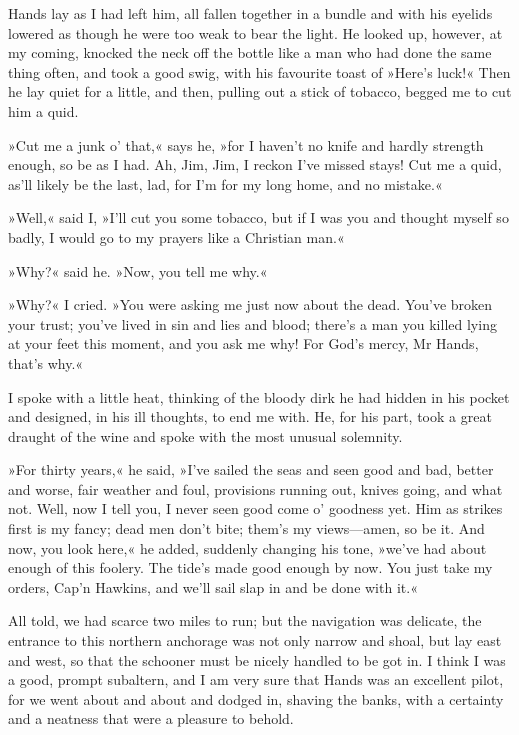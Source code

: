Hands lay as I had left him, all fallen together in a bundle and with his eyelids lowered as though he were too weak to bear the light. He looked up, however, at my coming, knocked the neck off the bottle like a man who had done the same thing often, and took a good swig, with his favourite toast of »Here's luck!« Then he lay quiet for a little, and then, pulling out a stick of tobacco, begged me to cut him a quid.

»Cut me a junk o' that,« says he, »for I haven't no knife and hardly strength enough, so be as I had. Ah, Jim, Jim, I reckon I've missed stays! Cut me a quid, as'll likely be the last, lad, for I'm for my long home, and no mistake.«

»Well,« said I, »I'll cut you some tobacco, but if I was you and thought myself so badly, I would go to my prayers like a Christian man.«

»Why?« said he. »Now, you tell me why.«

»Why?« I cried. »You were asking me just now about the dead. You've broken your trust; you've lived in sin and lies and blood; there's a man you killed lying at your feet this moment, and you ask me why! For God's mercy, Mr Hands, that's why.«

I spoke with a little heat, thinking of the bloody dirk he had hidden in his pocket and designed, in his ill thoughts, to end me with. He, for his part, took a great draught of the wine and spoke with the most unusual solemnity.

»For thirty years,« he said, »I've sailed the seas and seen good and bad, better and worse, fair weather and foul, provisions running out, knives going, and what not. Well, now I tell you, I never seen good come o' goodness yet. Him as strikes first is my fancy; dead men don't bite; them's my views—amen, so be it. And now, you look here,« he added, suddenly changing his tone, »we've had about enough of this foolery. The tide's made good enough by now. You just take my orders, Cap'n Hawkins, and we'll sail slap in and be done with it.«

All told, we had scarce two miles to run; but the navigation was delicate, the entrance to this northern anchorage was not only narrow and shoal, but lay east and west, so that the schooner must be nicely handled to be got in. I think I was a good, prompt subaltern, and I am very sure that Hands was an excellent pilot, for we went about and about and dodged in, shaving the banks, with a certainty and a neatness that were a pleasure to behold.


